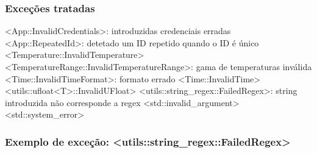 \documentclass{beamer}
\def\\{}
\def\texttt#1{<#1>}
\begin{document}
\begin{frame}
\frametitle{Exceções tratadas}
\texttt{App::InvalidCredentials}: introduzidas credenciais erradas\\
\texttt{App::RepeatedId}: detetado um ID repetido quando o ID é único\\
\texttt{Temperature::InvalidTemperature}\\
\texttt{TemperatureRange::InvalidTemperatureRange}: gama de temperaturas inválida\\
\texttt{Time::InvalidTimeFormat}: formato errado\\
\texttt{Time::InvalidTime}\\
\texttt{utils::ufloat<T>::InvalidUFloat}\\
\texttt{utils::string\_regex::FailedRegex}: string introduzida não corresponde a regex\\
\texttt{std::invalid\_argument}\\
\texttt{std::system\_error} 
\end{frame}

\begin{frame}
\frametitle{Exemplo de exceção: \texttt{utils::string\_regex::FailedRegex}}
\begin{center} \begin{minipage}{0.95\linewidth}


\end{minipage} \end{center}
\end{frame}
\end{document}
